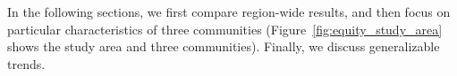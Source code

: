 %



In the following sections, we first compare region-wide results, and then focus on particular characteristics of three communities (Figure~\ref{fig:equity_study_area} shows the study area and three communities). Finally, we discuss generalizable trends.